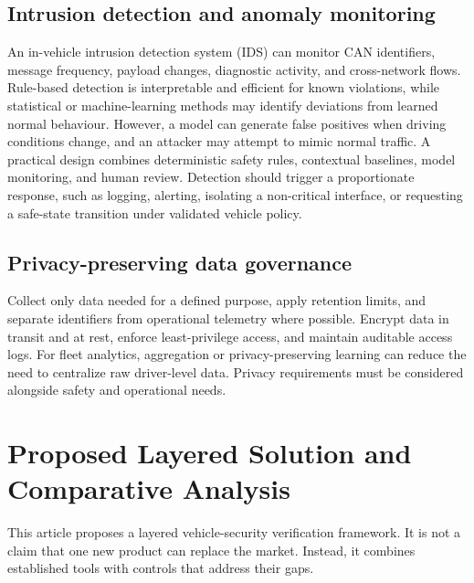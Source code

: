 \documentclass[11pt]{article}
\begin{document}
\subsection{Intrusion detection and anomaly monitoring}
An in-vehicle intrusion detection system (IDS) can monitor CAN identifiers, message frequency, payload changes, diagnostic activity, and cross-network flows. Rule-based detection is interpretable and efficient for known violations, while statistical or machine-learning methods may identify deviations from learned normal behaviour. However, a model can generate false positives when driving conditions change, and an attacker may attempt to mimic normal traffic. A practical design combines deterministic safety rules, contextual baselines, model monitoring, and human review. Detection should trigger a proportionate response, such as logging, alerting, isolating a non-critical interface, or requesting a safe-state transition under validated vehicle policy.

\subsection{Privacy-preserving data governance}
Collect only data needed for a defined purpose, apply retention limits, and separate identifiers from operational telemetry where possible. Encrypt data in transit and at rest, enforce least-privilege access, and maintain auditable access logs. For fleet analytics, aggregation or privacy-preserving learning can reduce the need to centralize raw driver-level data. Privacy requirements must be considered alongside safety and operational needs.

\section{Proposed Layered Solution and Comparative Analysis}
This article proposes a layered vehicle-security verification framework. It is not a claim that one new product can replace the market. Instead, it combines established tools with controls that address their gaps.
\end{document}
